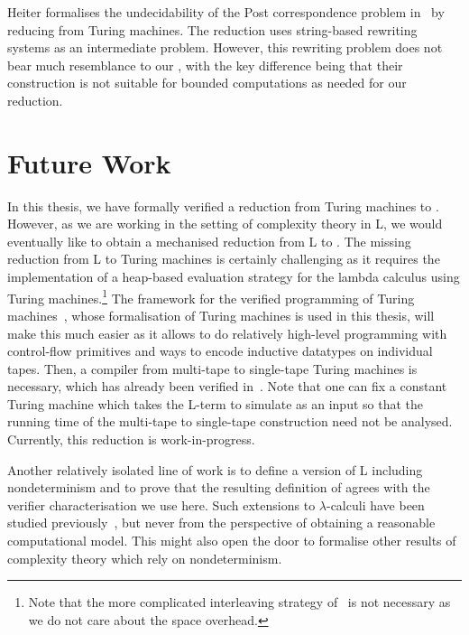 
Heiter formalises the undecidability of the Post correspondence problem in~\cite{heiter:pcp} by reducing from Turing machines. The reduction uses string-based rewriting systems as an intermediate problem. However, this rewriting problem does not bear much resemblance to our \PR{}, with the key difference being that their construction is not suitable for bounded computations as needed for our reduction.

\section{Future Work}
In this thesis, we have formally verified a reduction from Turing machines to \SAT{}. However, as we are working in the setting of complexity theory in L, we would eventually like to obtain a mechanised reduction from L to \SAT{}. 
The missing reduction from L to Turing machines is certainly challenging as it requires the implementation of a heap-based evaluation strategy for the lambda calculus using Turing machines.\footnote{Note that the more complicated interleaving strategy of~\cite{ForsterKunzeRoth:2019:wcbv-Reasonable} is not necessary as we do not care about the space overhead.} The framework for the verified programming of Turing machines~\cite{ForsterEtAl:2019:VerifiedTMs}, whose formalisation of Turing machines is used in this thesis, will make this much easier as it allows to do relatively high-level programming with control-flow primitives and ways to encode inductive datatypes on individual tapes. 
Then, a compiler from multi-tape to single-tape Turing machines is necessary, which has already been verified in~\cite{ForsterEtAl:2019:VerifiedTMs}. Note that one can fix a constant Turing machine which takes the L-term to simulate as an input so that the running time of the multi-tape to single-tape construction need not be analysed. 
Currently, this reduction is work-in-progress.

Another relatively isolated line of work is to define a version of L including nondeterminism and to prove that the resulting definition of \NP{} agrees with the verifier characterisation we use here. Such extensions to $\lambda$-calculi have been studied previously~\cite{kutzner:nondet_lambda}, but never from the perspective of obtaining a reasonable computational model. This might also open the door to formalise other results of complexity theory which rely on nondeterminism. 

